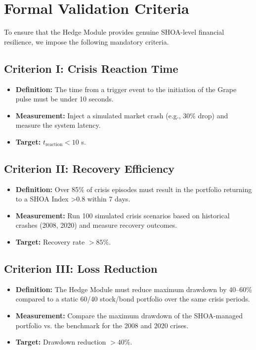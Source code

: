 \documentclass[12pt]{article}
\begin{document}
\section{Formal Validation Criteria}
To ensure that the Hedge Module provides genuine SHOA-level financial resilience, we impose the following mandatory criteria.

\subsection{Criterion I: Crisis Reaction Time}
\begin{itemize}
    \item \textbf{Definition:} The time from a trigger event to the initiation of the Grape pulse must be under 10 seconds.
    \item \textbf{Measurement:} Inject a simulated market crash (e.g., 30\% drop) and measure the system latency.
    \item \textbf{Target:} $t_{\text{reaction}} < 10$ s.
\end{itemize}

\subsection{Criterion II: Recovery Efficiency}
\begin{itemize}
    \item \textbf{Definition:} Over 85\% of crisis episodes must result in the portfolio returning to a SHOA Index >0.8 within 7 days.
    \item \textbf{Measurement:} Run 100 simulated crisis scenarios based on historical crashes (2008, 2020) and measure recovery outcomes.
    \item \textbf{Target:} Recovery rate $> 85\%$.
\end{itemize}

\subsection{Criterion III: Loss Reduction}
\begin{itemize}
    \item \textbf{Definition:} The Hedge Module must reduce maximum drawdown by 40--60\% compared to a static 60/40 stock/bond portfolio over the same crisis periods.
    \item \textbf{Measurement:} Compare the maximum drawdown of the SHOA-managed portfolio vs. the benchmark for the 2008 and 2020 crises.
    \item \textbf{Target:} Drawdown reduction $> 40\%$.
\end{itemize}
\end{document}
